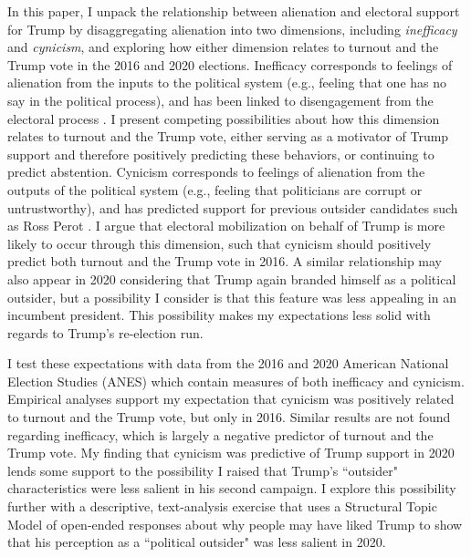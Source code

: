 \documentclass[12pt]{article}
\begin{document}
In this paper, I unpack the relationship between alienation and electoral support for Trump by disaggregating alienation into two dimensions, including \textit{inefficacy} and \textit{cynicism}, and exploring how either dimension relates to turnout and the Trump vote in the 2016 and 2020 elections. Inefficacy corresponds to feelings of alienation from the inputs to the political system (e.g., feeling that one has no say in the political process), and has been linked to disengagement from the electoral process \parencite{southwell2003politics}. I present competing possibilities about how this dimension relates to turnout and the Trump vote, either serving as a motivator of Trump support and therefore positively predicting these behaviors, or continuing to predict abstention. Cynicism corresponds to feelings of alienation from the outputs of the political system (e.g., feeling that politicians are corrupt or untrustworthy), and has predicted support for previous outsider candidates such as Ross Perot \parencite{southwell1998electoral}. I argue that electoral mobilization on behalf of Trump is more likely to occur through this dimension, such that cynicism should positively predict both turnout and the Trump vote in 2016. A similar relationship may also appear in 2020 considering that Trump again branded himself as a political outsider, but a possibility I consider is that this feature was less appealing in an incumbent president. This possibility makes my expectations less solid with regards to Trump's re-election run. 

I test these expectations with data from the 2016 and 2020 American National Election Studies (ANES) which contain measures of both inefficacy and cynicism. Empirical analyses support my expectation that cynicism was positively related to turnout and the Trump vote, but only in 2016. Similar results are not found regarding inefficacy, which is largely a negative predictor of turnout and the Trump vote. My finding that cynicism was predictive of Trump support in 2020 lends some support to the possibility I raised that Trump's ``outsider" characteristics were less salient in his second campaign. I explore this possibility further with a descriptive, text-analysis exercise that uses a Structural Topic Model of open-ended responses about why people may have liked Trump to show that his perception as a ``political outsider" was less salient in 2020. 
\end{document}
